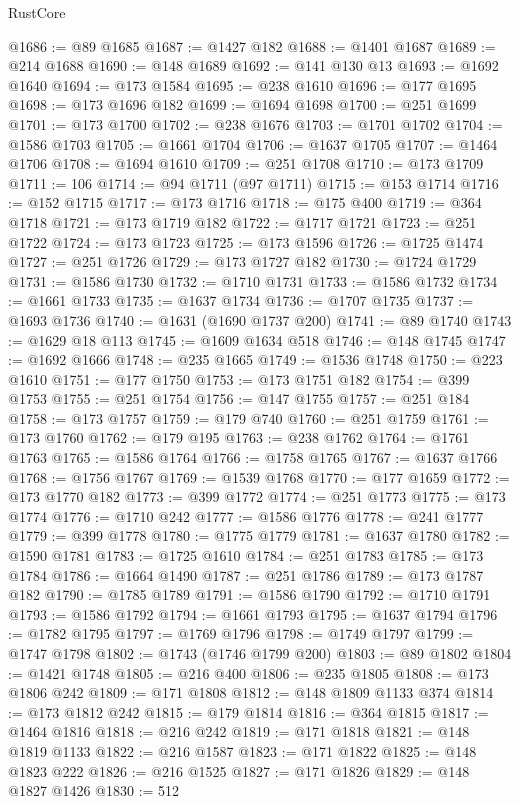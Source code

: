 \begin{lexlean}{RustCore}
\begin{coremodule}
@1686 := @89 @1685
@1687 := @1427 @182
@1688 := @1401 @1687
@1689 := @214 @1688
@1690 := @148 @1689
@1692 := @141 @130 @13
@1693 := @1692 @1640
@1694 := @173 @1584
@1695 := @238 @1610
@1696 := @177 @1695
@1698 := @173 @1696 @182
@1699 := @1694 @1698
@1700 := @251 @1699
@1701 := @173 @1700
@1702 := @238 @1676
@1703 := @1701 @1702
@1704 := @1586 @1703
@1705 := @1661 @1704
@1706 := @1637 @1705
@1707 := @1464 @1706
@1708 := @1694 @1610
@1709 := @251 @1708
@1710 := @173 @1709
@1711 := 106
@1714 := @94 @1711 (@97 @1711)
@1715 := @153 @1714
@1716 := @152 @1715
@1717 := @173 @1716
@1718 := @175 @400
@1719 := @364 @1718
@1721 := @173 @1719 @182
@1722 := @1717 @1721
@1723 := @251 @1722
@1724 := @173 @1723
@1725 := @173 @1596
@1726 := @1725 @1474
@1727 := @251 @1726
@1729 := @173 @1727 @182
@1730 := @1724 @1729
@1731 := @1586 @1730
@1732 := @1710 @1731
@1733 := @1586 @1732
@1734 := @1661 @1733
@1735 := @1637 @1734
@1736 := @1707 @1735
@1737 := @1693 @1736
@1740 := @1631 (@1690 @1737 @200)
@1741 := @89 @1740
@1743 := @1629 @18 @113
@1745 := @1609 @1634 @518
@1746 := @148 @1745
@1747 := @1692 @1666
@1748 := @235 @1665
@1749 := @1536 @1748
@1750 := @223 @1610
@1751 := @177 @1750
@1753 := @173 @1751 @182
@1754 := @399 @1753
@1755 := @251 @1754
@1756 := @147 @1755
@1757 := @251 @184
@1758 := @173 @1757
@1759 := @179 @740
@1760 := @251 @1759
@1761 := @173 @1760
@1762 := @179 @195
@1763 := @238 @1762
@1764 := @1761 @1763
@1765 := @1586 @1764
@1766 := @1758 @1765
@1767 := @1637 @1766
@1768 := @1756 @1767
@1769 := @1539 @1768
@1770 := @177 @1659
@1772 := @173 @1770 @182
@1773 := @399 @1772
@1774 := @251 @1773
@1775 := @173 @1774
@1776 := @1710 @242
@1777 := @1586 @1776
@1778 := @241 @1777
@1779 := @399 @1778
@1780 := @1775 @1779
@1781 := @1637 @1780
@1782 := @1590 @1781
@1783 := @1725 @1610
@1784 := @251 @1783
@1785 := @173 @1784
@1786 := @1664 @1490
@1787 := @251 @1786
@1789 := @173 @1787 @182
@1790 := @1785 @1789
@1791 := @1586 @1790
@1792 := @1710 @1791
@1793 := @1586 @1792
@1794 := @1661 @1793
@1795 := @1637 @1794
@1796 := @1782 @1795
@1797 := @1769 @1796
@1798 := @1749 @1797
@1799 := @1747 @1798
@1802 := @1743 (@1746 @1799 @200)
@1803 := @89 @1802
@1804 := @1421 @1748
@1805 := @216 @400
@1806 := @235 @1805
@1808 := @173 @1806 @242
@1809 := @171 @1808
@1812 := @148 @1809 @1133 @374
@1814 := @173 @1812 @242
@1815 := @179 @1814
@1816 := @364 @1815
@1817 := @1464 @1816
@1818 := @216 @242
@1819 := @171 @1818
@1821 := @148 @1819 @1133
@1822 := @216 @1587
@1823 := @171 @1822
@1825 := @148 @1823 @222
@1826 := @216 @1525
@1827 := @171 @1826
@1829 := @148 @1827 @1426
@1830 := 512

\end{coremodule}
\end{lexlean}
